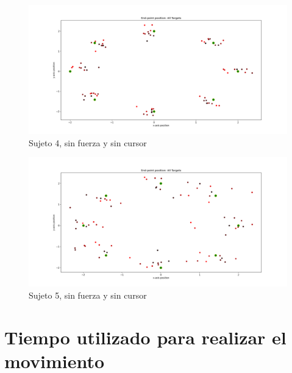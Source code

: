 \documentclass[a4paper,11pt, oneside]{book}
\begin{document}
\begin{figure}[H]
	\includegraphics[width=\linewidth]{sujeto4/no_force_no_cursor/trayectorias_puntos}
	\caption{Sujeto 4, sin  fuerza y sin cursor}
	\label{4-3-2}
\end{figure}
\begin{figure}[H]
	\includegraphics[width=\linewidth]{sujeto5/no_force_no_cursor/trayectorias_puntos}
	\caption{Sujeto 5, sin  fuerza y sin cursor}
	\label{5-3-2}
\end{figure}


\section{Tiempo utilizado para realizar el movimiento}
\label{anexo:6}
\end{document}
